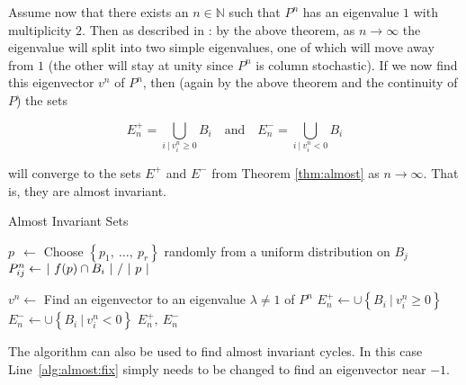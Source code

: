 Assume now that there exists an $n \in \mathbb{N}$ such that $P^n$ has an eigenvalue $1$ 
with multiplicity $2$. Then as described in \cite*{algGAIO}: by the above theorem, 
as $n \to \infty$ the eigenvalue will split into two simple eigenvalues, one of 
which will move away from $1$ (the other will stay at unity since $P^n$ is column 
stochastic). If we now find this eigenvector $v^n$ of $P^n$, then (again by the above 
theorem and the continuity of $P$) the sets 

\begin{equation}
    E_n^+ = \bigcup_{i\ \vert\ v_i^n \geq 0} B_i
    \quad \text{and} \quad 
    E_n^- = \bigcup_{i\ \vert\ v_i^n < 0} B_i 
\end{equation}
    
will converge to the sets $E^+$ and $E^-$ from Theorem \ref{thm:almost} as $n \to \infty$. 
That is, they are almost invariant. 

\begin{algorithm}
    \caption{Almost Invariant Sets}
    \label{alg:almost}
    \begin{spacing}{1.2}
        \begin{algorithmic}[1]

                \State $p\ \ \gets $ Choose $\left\{ p_1,\ \ldots,\ p_r \right\}$ randomly from a uniform distribution on $B_j$
                \State $P_{ij}^n \gets \left. |\ f(p) \cap B_i\ | \ \middle/\ |\ p\ | \right.$
            \EndFor
    
            \State $v^n \gets $ Find an eigenvector to an eigenvalue $\lambda \neq 1$ of $P^n$
            \label{alg:almost:fix}
            \State $E_n^+ \gets \cup \left\{ B_i\ \vert\ v_i^n \geq 0 \right\}$
            \State $E_n^- \gets \cup \left\{ B_i\ \vert\ v_i^n < 0 \right\}$
            \State \Return $E_n^+,\ E_n^-$
        \end{algorithmic}
    \end{spacing}
\end{algorithm}

\begin{remark}
    The algorithm can also be used to find almost invariant cycles. In this case 
    Line~\ref{alg:almost:fix} simply needs to be changed to find an eigenvector near $-1$. \\
\end{remark} 

